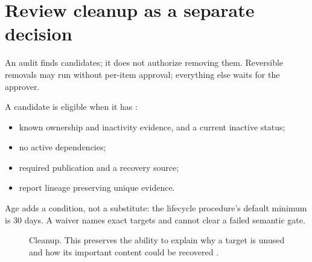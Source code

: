 
\section{Review cleanup as a separate decision}

\begin{headline}
  An audit finds candidates; it does not authorize removing them. Reversible removals may
  run without per-item approval; everything else waits for the approver.
\end{headline}

A candidate is eligible when it has \cite[Autonomous with
\texttt{-{}-apply}]{skill:lifecycle}:
\begin{itemize}
  \item known ownership and inactivity evidence, and a current inactive status;
  \item no active dependencies;
  \item required publication and a recovery source;
  \item report lineage preserving unique evidence.
\end{itemize}
Age adds a condition, not a substitute: the lifecycle procedure's default minimum is 30
days. A waiver names exact targets and cannot clear a failed semantic gate.

\begin{figure}[H]
  \centering
  \caption{Cleanup. This preserves the ability to explain why a target is unused and how its
    important content could be recovered \cite[When; Command]{skill:lifecycle}.}
  \label{fig:recovery-cleanup}
\end{figure}

